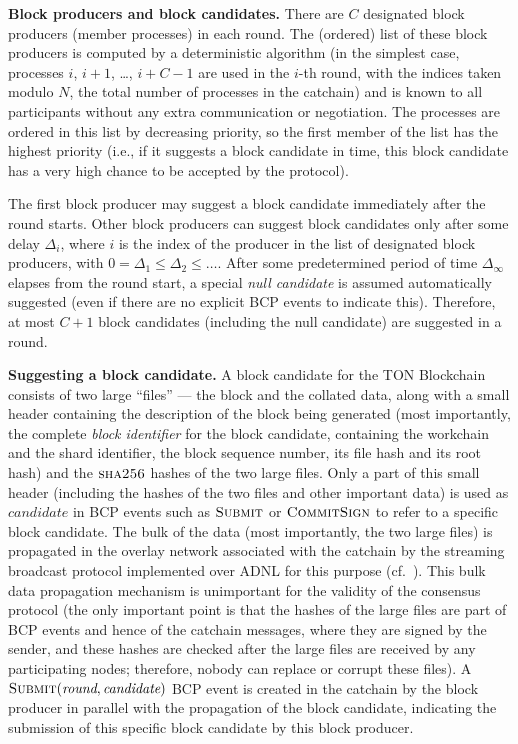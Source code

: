\documentclass[12pt,oneside]{article}
\def\makepoint#1{\medbreak\noindent{\bf #1.\ }}
\def\nxsubpoint{\refstepcounter{subsubsection}%
  \smallbreak\makepoint{\thesubsubsection}}
\def\emb#1{\textbf{#1.}}
\let\vr=\textit
\def\opsc#1{\operatorname{\textsc{#1}}}
\def\Sha{\opsc{sha256}}
\def\Submit{\opsc{Submit}}
\def\CommitSign{\opsc{CommitSign}}
\def\wround{\vr{round}}
\def\wcandidate{\vr{candidate}}
\begin{document}
\nxsubpoint\emb{Block producers and block candidates}
There are $C$ designated block producers (member processes) in each round. The (ordered) list of these block producers is computed by a deterministic algorithm (in the simplest case, processes $i$, $i+1$, \dots, $i+C-1$ are used in the $i$-th round, with the indices taken modulo $N$, the total number of processes in the catchain) and is known to all participants without any extra communication or negotiation. The processes are ordered in this list by decreasing priority, so the first member of the list has the highest priority (i.e., if it suggests a block candidate in time, this block candidate has a very high chance to be accepted by the protocol).

The first block producer may suggest a block candidate immediately after the round starts. Other block producers can suggest block candidates only after some delay $\Delta_i$, where $i$ is the index of the producer in the list of designated block producers, with $0=\Delta_1\leq\Delta_2\leq\ldots$. After some predetermined period of time $\Delta_\infty$ elapses from the round start, a special {\em null candidate\/} is assumed automatically suggested (even if there are no explicit BCP events to indicate this). Therefore, at most $C+1$ block candidates (including the null candidate) are suggested in a round.

\nxsubpoint\emb{Suggesting a block candidate}
A block candidate for the TON Block\-chain consists of two large ``files'' --- the block and the collated data, along with a small header containing the description of the block being generated (most importantly, the complete {\em block identifier\/} for the block candidate, containing the workchain and the shard identifier, the block sequence number, its file hash and its root hash) and the $\Sha$ hashes of the two large files. Only a part of this small header (including the hashes of the two files and other important data) is used as $\wcandidate$ in BCP events such as $\Submit$ or $\CommitSign$ to refer to a specific block candidate. The bulk of the data (most importantly, the two large files) is propagated in the overlay network associated with the catchain by the streaming broadcast protocol implemented over ADNL for this purpose (cf.~\cite[5]{TON}). This bulk data propagation mechanism is unimportant for the validity of the consensus protocol (the only important point is that the hashes of the large files are part of BCP events and hence of the catchain messages, where they are signed by the sender, and these hashes are checked after the large files are received by any participating nodes; therefore, nobody can replace or corrupt these files). A $\Submit(\wround,\wcandidate)$ BCP event is created in the catchain by the block producer in parallel with the propagation of the block candidate, indicating the submission of this specific block candidate by this block producer.
\end{document}
